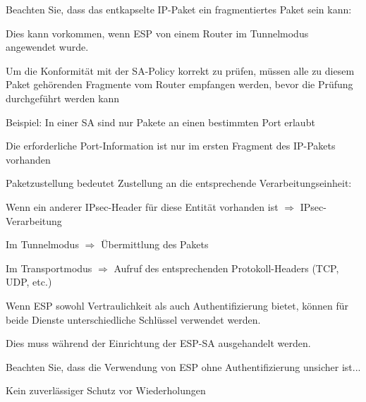 \documentclass[a4paper]{article}
\begin{document}
\begin{multicols}{3}
\begin{itemize*}
            \item Beachten Sie, dass das entkapselte IP-Paket ein fragmentiertes Paket sein kann:
            \begin{itemize*}
                  \item Dies kann vorkommen, wenn ESP von einem Router im Tunnelmodus angewendet wurde.
                  \item Um die Konformität mit der SA-Policy korrekt zu prüfen, müssen alle zu diesem Paket gehörenden Fragmente vom Router empfangen werden, bevor die Prüfung durchgeführt werden kann
                  \item Beispiel: In einer SA sind nur Pakete an einen bestimmten Port erlaubt
                  \item Die erforderliche Port-Information ist nur im ersten Fragment des IP-Pakets vorhanden
            \end{itemize*}
            \item Paketzustellung bedeutet Zustellung an die entsprechende Verarbeitungseinheit:
            \begin{itemize*}
                  \item Wenn ein anderer IPsec-Header für diese Entität vorhanden ist $\Rightarrow$ IPsec-Verarbeitung
                  \item Im Tunnelmodus $\Rightarrow$ Übermittlung des Pakets
                  \item Im Transportmodus $\Rightarrow$ Aufruf des entsprechenden Protokoll-Headers (TCP, UDP, etc.)
            \end{itemize*}
            \item Wenn ESP sowohl Vertraulichkeit als auch Authentifizierung bietet, können für beide Dienste unterschiedliche Schlüssel verwendet werden.
            \begin{itemize*}
                  \item Dies muss während der Einrichtung der ESP-SA ausgehandelt werden.
            \end{itemize*}
            \item Beachten Sie, dass die Verwendung von ESP ohne Authentifizierung unsicher ist...
            \begin{itemize*}
                  \item Kein zuverlässiger Schutz vor Wiederholungen

\end{itemize*}
\end{itemize*}
\end{multicols}
\end{document}
